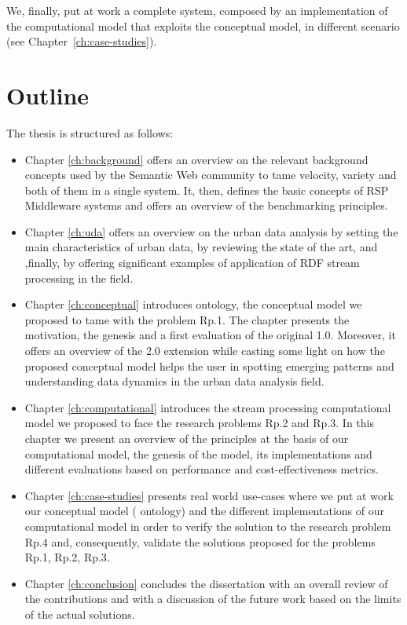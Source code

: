 We, finally, put at work a complete system, composed by an implementation of the computational model that exploits the conceptual model, in different scenario (see Chapter~\ref{ch:case-studies}).

\section{Outline}
The thesis is structured as follows:
\begin{itemize}
\item Chapter \ref{ch:background} offers an overview on the relevant background concepts used by the Semantic Web community to tame velocity, variety and both of them in a single system. It, then, defines the basic concepts of RSP Middleware systems and offers an overview of the benchmarking principles.

\item Chapter \ref{ch:uda} offers an overview on the urban data analysis by setting the main characteristics of urban data, by reviewing the state of the art, and ,finally, by offering significant examples of application of RDF stream processing in the field.

\item Chapter \ref{ch:conceptual} introduces \frappe{} ontology, the conceptual model we proposed to tame with the problem \textsf{Rp.1}. The chapter presents the motivation, the genesis and a first evaluation of the original \frappe{} 1.0. Moreover, it offers an overview of the \frappe{} 2.0 extension while casting some light on how the proposed conceptual model helps the user in spotting emerging patterns and understanding data dynamics in the urban data analysis field.

\item Chapter \ref{ch:computational} introduces the stream processing computational model we proposed to face the research problems \textsf{Rp.2} and \textsf{Rp.3}. In this chapter we present an overview of the principles at the basis of our computational model, the genesis of the model, its implementations and different evaluations based on performance and cost-effectiveness metrics.

\item Chapter \ref{ch:case-studies} presents real world use-cases where we put at work our conceptual model (\frappe{} ontology) and the different implementations of our computational model in order to verify the solution to the research problem \textsf{Rp.4} and, consequently, validate the solutions proposed for the problems \textsf{Rp.1}, \textsf{Rp.2}, \textsf{Rp.3}. 

\item Chapter \ref{ch:conclusion} concludes the dissertation with an overall review of the contributions and with a discussion of the future work based on the limits of the actual solutions.
\end{itemize}

